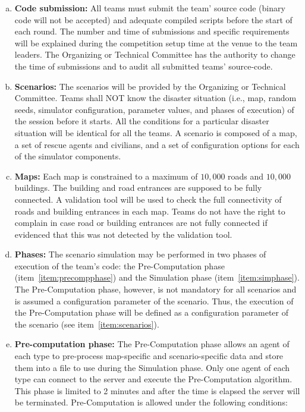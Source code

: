 \documentclass{article}
\begin{document}
\begin{enumerate}[(a)]
\item \textbf{Code submission:} All teams must submit the team' source code (binary code will not be accepted) and adequate compiled scripts before the start of each round. The number and time of submissions and specific requirements will be explained during the competition setup time at the venue to the team leaders. The Organizing or Technical Committee has the authority to change the time of submissions and to audit all submitted teams' source-code.
\item \textbf{Scenarios:} The scenarios will be provided by the Organizing or Technical Committee. Teams shall NOT know the disaster situation (i.e., map, random seeds, simulator configuration, parameter values, and phases of execution) of the session before it starts. All the conditions for a particular disaster situation will be identical for all the teams. A scenario is composed of a map, a set of rescue agents and civilians, and a set of configuration options for each of the simulator components. \label{item:scenarios}
\item \textbf{Maps:} Each map is constrained to a maximum of $10,000$ roads and $10,000$ buildings. The building and road entrances are supposed to be fully connected. A validation tool will be used to check the full connectivity of roads and building entrances in each map. Teams do not have the right to complain in case road or building entrances are not fully connected if evidenced that this was not detected by the validation tool.
\item \textbf{Phases:} The scenario simulation may be performed in two phases of execution of the team's code: the Pre-Computation phase (item~\ref{item:precompphase}) and the Simulation phase (item~\ref{item:simphase}). The Pre-Computation phase, however, is not mandatory for all scenarios and is assumed a configuration parameter of the scenario. Thus, the execution of the Pre-Computation phase will be defined as a configuration parameter of the scenario (see item~\ref{item:scenarios}). \label{item:phases}
\item \textbf{Pre-computation phase:} The Pre-Computation phase allows an agent of each type to pre-process map-specific and scenario-specific data and store them into a file to use during the Simulation phase. Only one agent of each type can connect to the server and execute the Pre-Computation algorithm. This phase is limited to 2 minutes and after the time is elapsed the server will be terminated. Pre-Computation is allowed under the following conditions: \label{item:precompphase}

\end{enumerate}
\end{document}
